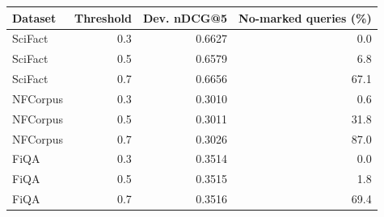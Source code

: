\begin{tabular}{lrrr}
\toprule
Dataset & Threshold & Dev. nDCG@5 & No-marked queries (\%)\\
\midrule
SciFact & 0.3 & 0.6627 & 0.0\\
SciFact & 0.5 & 0.6579 & 6.8\\
SciFact & 0.7 & 0.6656 & 67.1\\
NFCorpus & 0.3 & 0.3010 & 0.6\\
NFCorpus & 0.5 & 0.3011 & 31.8\\
NFCorpus & 0.7 & 0.3026 & 87.0\\
FiQA & 0.3 & 0.3514 & 0.0\\
FiQA & 0.5 & 0.3515 & 1.8\\
FiQA & 0.7 & 0.3516 & 69.4\\
\bottomrule
\end{tabular}
